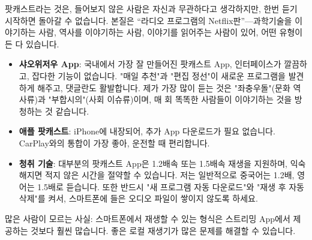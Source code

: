
팟캐스트라는 것은, 들어보지 않은 사람은 자신과 무관하다고 생각하지만, 한번 듣기 시작하면 돌아갈 수 없습니다. 본질은 “라디오 프로그램의 Netflix판”—과학기술을 이야기하는 사람, 역사를 이야기하는 사람, 이야기를 읽어주는 사람이 있어, 어떤 유형이든 다 있습니다.

\begin{itemize}
  \item \textbf{샤오위저우 App}: 국내에서 가장 잘 만들어진 팟캐스트 App, 인터페이스가 깔끔하고, 잡다한 기능이 없습니다. "매일 추천"과 "편집 정선"이 새로운 프로그램을 발견하게 해주고, 댓글란도 활발합니다. 제가 가장 많이 듣는 것은 "좌충우돌"(문화 역사류)과 "부합시의"(사회 이슈류)이며, 매 회 똑똑한 사람들이 이야기하는 것을 방청하는 것 같습니다.
  \item \textbf{애플 팟캐스트}: iPhone에 내장되어, 추가 App 다운로드가 필요 없습니다. CarPlay와의 통합이 가장 좋아, 운전할 때 편리합니다.
  \item \textbf{청취 기술}: 대부분의 팟캐스트 App은 1.2배속 또는 1.5배속 재생을 지원하며, 익숙해지면 적지 않은 시간을 절약할 수 있습니다. 저는 일반적으로 중국어는 1.2배, 영어는 1.5배로 듣습니다. 또한 반드시 "새 프로그램 자동 다운로드"와 "재생 후 자동 삭제"를 켜서, 스마트폰에 들은 오디오 파일이 쌓이지 않도록 하세요.
\end{itemize}


많은 사람이 모르는 사실: 스마트폰에서 재생할 수 있는 형식은 스트리밍 App에서 제공하는 것보다 훨씬 많습니다. 좋은 로컬 재생기가 많은 문제를 해결할 수 있습니다.

